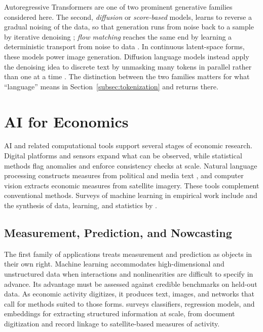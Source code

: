 \documentclass[12pt]{article}
\theoremstyle{plain}
\theoremstyle{definition}
\theoremstyle{remark}
\begin{document}
Autoregressive Transformers are one of two prominent generative families
considered here. The second, \emph{diffusion} or \emph{score-based} models,
learns to reverse a gradual noising of the data, so that generation runs
from noise back to a sample by iterative denoising
\citep{HoJainAbbeel2020DDPM}; \emph{flow matching} reaches the same end by
learning a deterministic transport from noise to data
\citep{LipmanEtAl2023FlowMatching}. In continuous latent-space forms,
these models power image generation. Diffusion language models instead
apply the denoising idea to discrete text by unmasking many tokens in
parallel rather than one at a time
\citep{NieEtAl2025LLaDA}. The distinction between the two families
matters for what ``language'' means in
Section~\ref{subsec:tokenization} and returns there.

\section{AI for Economics}\label{sec:ai-for-econ}

AI and related computational tools support several stages of
economic research. Digital platforms and sensors expand what can be
observed, while statistical methods flag anomalies and enforce
consistency checks at scale. Natural language processing constructs
measures from political and media text \citep{GentzkowKellyTaddy2019},
and computer vision extracts economic measures from satellite imagery.
These tools complement conventional methods. Surveys of machine learning
in empirical work include \citet{AtheyImbens2019} and the synthesis of
data, learning, and statistics by \citet{Hong2021}.

\subsection{Measurement, Prediction, and Nowcasting}%
\label{subsec:prediction}

The first family of applications treats measurement and prediction
as objects in their own right. Machine learning accommodates
high-dimensional and unstructured data when interactions and
nonlinearities are difficult to specify in advance. Its advantage must
be assessed against credible benchmarks on held-out data. As economic
activity digitizes, it produces text, images, and networks that call for
methods suited to those forms. \citet{Dell2025} surveys classifiers,
regression models, and embeddings for extracting structured information
at scale, from document digitization and record linkage to
satellite-based measures of activity.
\end{document}
